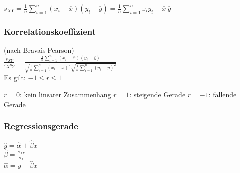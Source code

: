 \documentclass[10pt,a4paper]{article}
\begin{document}
$s_{XY} = \frac{1}{n} \sum\limits_{i=1}^n (x_i - \overline{x})(y_i - \overline{y}) 
= \frac{1}{n} \sum\limits_{i=1}^n x_i y_i - \overline{x} ~ \overline{y}$

\subsubsection{Korrelationskoeffizient}
(nach Bravais-Pearson)\\

$\frac{s_{XY}}{s_X s_Y} = 
 \frac{  \frac{1}{n} \sum\limits_{i=1}^n (x_i - \overline{x})(y_i - \overline{y}) }
 {\sqrt{\frac{1}{n} \sum\limits_{i=1}^n (x_i - \overline{x})^2} \sqrt{\frac{1}{n} \sum\limits_{i=1}^n (y_i - 
 \overline{y})^2}}$\\
 
 Es gilt: $-1 \leqslant r \leqslant 1$
 
 $r = 0$: kein linearer Zusammenhang
 $r = 1$: steigende Gerade
 $r = -1$: fallende Gerade 
 
 \subsubsection{Regressionsgerade}
 
 $\hat{y} = \hat{\alpha} + \hat{\beta}x$\\
 
 $\hat{\beta} = \frac{s_{XY}}{s_X}$\\
 
 $\hat{\alpha} = \overline{y} - \hat{\beta}\overline{x}$\\
 
\end{document}
